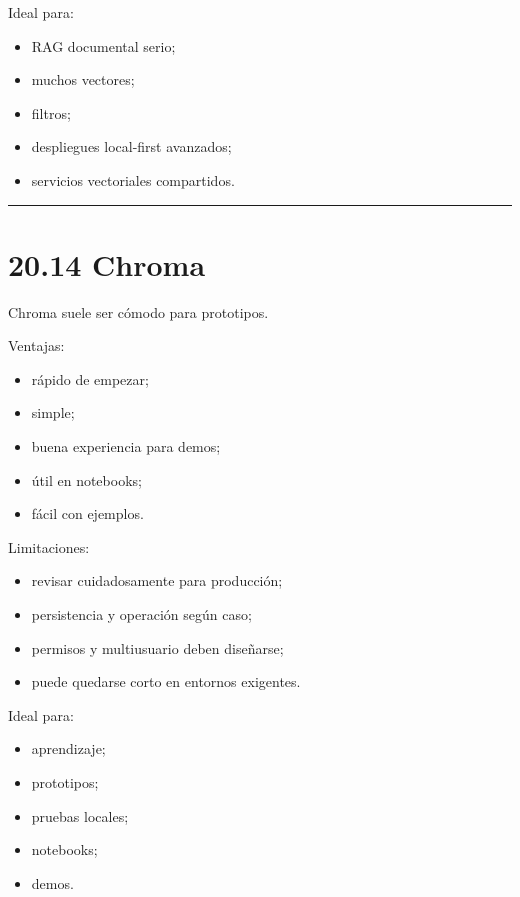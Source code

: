 Ideal para:

\begin{itemize}
\tightlist
\item
  RAG documental serio;
\item
  muchos vectores;
\item
  filtros;
\item
  despliegues local-first avanzados;
\item
  servicios vectoriales compartidos.
\end{itemize}

\begin{center}\rule{0.5\linewidth}{0.5pt}\end{center}

\section{20.14 Chroma}\label{chroma}

Chroma suele ser cómodo para prototipos.

Ventajas:

\begin{itemize}
\tightlist
\item
  rápido de empezar;
\item
  simple;
\item
  buena experiencia para demos;
\item
  útil en notebooks;
\item
  fácil con ejemplos.
\end{itemize}

Limitaciones:

\begin{itemize}
\tightlist
\item
  revisar cuidadosamente para producción;
\item
  persistencia y operación según caso;
\item
  permisos y multiusuario deben diseñarse;
\item
  puede quedarse corto en entornos exigentes.
\end{itemize}

Ideal para:

\begin{itemize}
\tightlist
\item
  aprendizaje;
\item
  prototipos;
\item
  pruebas locales;
\item
  notebooks;
\item
  demos.
\end{itemize}

